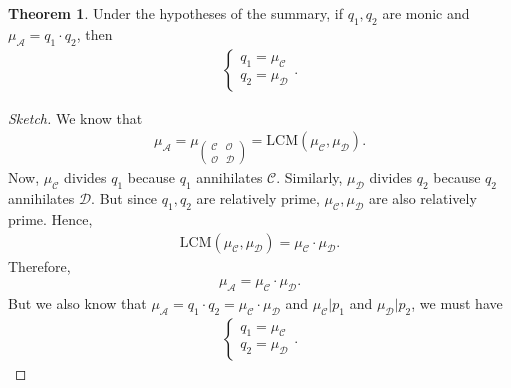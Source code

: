 \documentclass{book}
\theoremstyle{definition}
\newtheorem{thm}{Theorem}[section]
\newcommand{\A}{\mathcal{A}}
\begin{document}
\begin{thm}
	Under the hypotheses of the summary, if $q_1, q_2$ are monic and $\mu_\A= q_1 \cdot q_2$, then 
	\begin{align*}
	\begin{cases}
	q_1 = \mu_\mathcal{C}\\
	q_2 = \mu_\mathcal{D}
	\end{cases}.
	\end{align*}
	
	\begin{proof}[Sketch]
		We know that \begin{align*}
		\mu_\A = \mu_{\begin{pmatrix}
			\mathcal{C} & \mathcal{O}\\
			\mathcal{O} & \mathcal{D}
			\end{pmatrix}} = \text{LCM}(\mu_\mathcal{C} , \mu_\mathcal{D}).
		\end{align*}
		Now, $\mu_\mathcal{C}$ divides $q_1$ because $q_1$ annihilates $\mathcal{C}$. Similarly, $\mu_\mathcal{D}$ divides $q_2$ because $q_2$ annihilates $\mathcal{D}$. But since $q_1, q_2$ are relatively prime, $\mu_\mathcal{C}, \mu_\mathcal{D}$ are also relatively prime. Hence,
		\begin{align*}
		\text{LCM}(\mu_\mathcal{C}, \mu_\mathcal{D}) = \mu_\mathcal{C} \cdot \mu_\mathcal{D}.
		\end{align*}
		Therefore,
		\begin{align*}
		\mu_\A = \mu_\mathcal{C} \cdot \mu_\mathcal{D}.
		\end{align*}
		But we also know that $\mu_\A = q_1 \cdot q_2 = \mu_\mathcal{C} \cdot \mu_\mathcal{D}$ and $\mu_\mathcal{C}\big\vert p_1$ and $\mu_\mathcal{D}\big\vert p_2$, we must have
		\begin{align*}
		\begin{cases}
		q_1 = \mu_\mathcal{C}\\
		q_2 = \mu_\mathcal{D}
		\end{cases}.
		\end{align*}
	\end{proof}
\end{thm}
\end{document}
